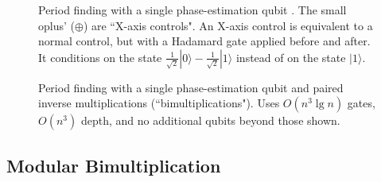 \documentclass[twocolumn,longbibliography]{quantumarticle}
\begin{document}
\begin{figure}
  \centering
  \caption{
	Period finding with a single phase-estimation qubit \cite{beauregard2003}.
	The small oplus' ({\tiny $\oplus$}) are ``X-axis controls".
	An X-axis control is equivalent to a normal control, but with a Hadamard gate applied before and after.
	It conditions on the state $\frac{1}{\sqrt 2}|0\rangle - \frac{1}{\sqrt 2}|1\rangle$ instead of on the state $|1\rangle$.
  }
  \label{fig:period-finding-solo-phase-qubit}
\end{figure}

\begin{figure}
  \centering
  \caption{
	Period finding with a single phase-estimation qubit and paired inverse multiplications (``bimultiplications").
	Uses $O(n^3 \lg n)$ gates, $O(n^3)$ depth, and no additional qubits beyond those shown.
  }
  \label{fig:period-finding-solo-phase-qubit-explicit-dirty-register}
\end{figure}


\subsection{Modular Bimultiplication}
\end{document}
